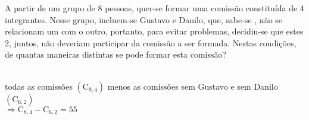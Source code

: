 \begin{ex}
A partir de um grupo de 8 pessoas, quer-se formar uma comissão constituída de 4 integrantes. Nesse grupo, incluem-se Gustavo e Danilo, que, sabe-se , não se relacionam um com o outro, portanto, para evitar problemas, decidiu-se que estes 2, juntos, não deveriam participar da comissão a ser formada. Nestas condições, de quantas maneiras distintas se pode formar esta comissão?
 \begin{sol}
   \phantom{A} \\
   todas as comissões $(\mathrm{C}_{8,4})$  menos as comissões sem Gustavo e sem Danilo $(\mathrm{C}_{6,2})$  \\
   $\Longrightarrow \mathrm{C}_{8,4} - \mathrm{C}_{6,2} = 55$
 \end{sol}
\end{ex}